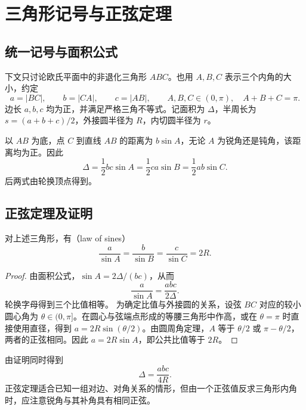 \documentclass[UTF8]{ctexart}
\begin{document}
\section{三角形记号与正弦定理}
\label{sec:trig-sine-law}

\subsection{统一记号与面积公式}

下文只讨论欧氏平面中的非退化三角形 $ABC$。也用 $A,B,C$ 表示三个内角的大小，约定
\[
  a=|BC|,\qquad b=|CA|,\qquad c=|AB|,\qquad
  A,B,C\in(0,\pi),\quad A+B+C=\pi.
\]
边长 $a,b,c$ 均为正，并满足严格三角不等式。记面积为 $\Delta$，半周长为 $s=(a+b+c)/2$，外接圆半径为 $R$，内切圆半径为 $r$。

以 $AB$ 为底，点 $C$ 到直线 $AB$ 的距离为 $b\sin A$，无论 $A$ 为锐角还是钝角，该距离均为正。因此
\begin{equation}\label{eq:trig-area}
  \boxed{\Delta=\frac12bc\sin A
  =\frac12ca\sin B=\frac12ab\sin C}.
\end{equation}
后两式由轮换顶点得到。

\subsection{正弦定理及证明}

\begin{theorem}[正弦定理]
对上述三角形，有（law of sines）
\begin{equation}\label{eq:trig-sine-law}
  \boxed{\frac a{\sin A}=\frac b{\sin B}=\frac c{\sin C}=2R}.
\end{equation}
\end{theorem}

\begin{proof}
由面积公式，$\sin A=2\Delta/(bc)$，从而
\[
  \frac a{\sin A}=\frac{abc}{2\Delta}.
\]
轮换字母得到三个比值相等。
为确定比值与外接圆的关系，设弦 $BC$ 对应的较小圆心角为 $\theta\in(0,\pi]$。在圆心与弦端点形成的等腰三角形中作高，或在 $\theta=\pi$ 时直接使用直径，得到 $a=2R\sin(\theta/2)$。由圆周角定理，$A$ 等于 $\theta/2$ 或 $\pi-\theta/2$，两者的正弦相同。因此 $a=2R\sin A$，即公共比值等于 $2R$。
\end{proof}

由证明同时得到
\begin{equation}\label{eq:trig-circum-area}
  \Delta=\frac{abc}{4R}.
\end{equation}
正弦定理适合已知一组对边、对角关系的情形，但由一个正弦值反求三角形内角时，应注意锐角与其补角具有相同正弦。
\end{document}
